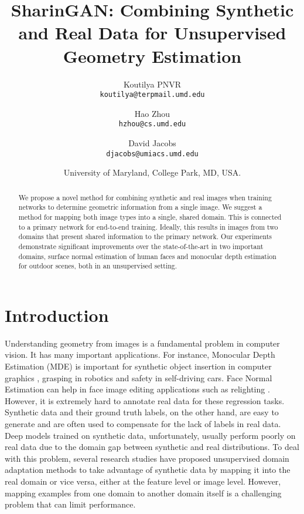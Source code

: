\documentclass[10pt,twocolumn,letterpaper]{article}
\begin{document}
\title{
SharinGAN: Combining Synthetic and Real Data for Unsupervised Geometry Estimation
}


\author{Koutilya PNVR\\
{\tt\small koutilya@terpmail.umd.edu}
\and
Hao Zhou\footnotemark\hspace{1cm}\\
{\tt\small hzhou@cs.umd.edu}
\and
David Jacobs\\
{\tt\small djacobs@umiacs.umd.edu}
\and
University of Maryland, College Park, MD, USA.
}

\maketitle
{}

\begin{abstract}
   We propose a novel method for combining synthetic and real images when training networks to determine geometric information from a single image.  We suggest a method for mapping both image types into a single, shared domain.  This is connected to a primary network for end-to-end training.  Ideally, this results in images from two domains that present shared information to the primary network.  Our experiments demonstrate significant improvements over the state-of-the-art in two important domains, surface normal estimation of human faces and monocular depth estimation for outdoor scenes, both in an unsupervised setting. 
   
\end{abstract}

\section{Introduction}









Understanding geometry from images
is a fundamental problem in computer vision.
It has many important applications.
For instance, Monocular Depth Estimation (MDE) is important for synthetic object insertion in computer graphics \cite{Karsch:2014:ASI:2631978.2602146}, grasping in robotics \cite{doi:10.1177/0278364914549607} and safety in self-driving cars. 
Face Normal Estimation can help in face image editing applications such as relighting \cite{SfSNet,Face_Relighting,DPR}.
However, it is extremely hard to annotate real data for these regression tasks.
Synthetic data and their ground truth labels, on the other hand, are easy to generate and are often used to compensate for the lack of labels in real data. 
Deep models trained on synthetic data, unfortunately, usually perform poorly on real data due to the domain gap between synthetic and real distributions.
To deal with this problem, several research studies \cite{adaDepth,T2NET,GASDA,Amir2018} have proposed unsupervised domain adaptation methods to take advantage of synthetic data by mapping it into the real domain or vice versa, either at the feature level or image level. However, mapping examples from one domain to another domain itself is a challenging problem that can limit performance.
\end{document}

